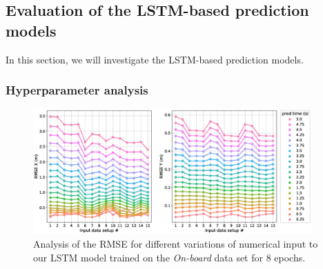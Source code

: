 \subsection{Evaluation of the \acs{LSTM}-based prediction models}%
\label{subsec:evaluation_of_the_lstm_based_prediction_models}

In this section, we will investigate the \ac{LSTM}-based prediction models.

\subsubsection{Hyperparameter analysis}%
\label{ssubsec:hyperparameter_analysis_lstms}

\begin{figure}[t!]
  \centering
  \includegraphics[width=0.95\textwidth]{imgs/lstm_input_data_analysis.eps}
  \caption{Analysis of the \ac{RMSE} for different variations of numerical input to our \ac{LSTM} model trained on the \emph{On-board} data set for \num{8} epochs.}
  \label{fig:lstm_input_data_analysis}
\end{figure}

